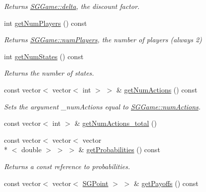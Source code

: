 \begin{DoxyCompactItemize}
\begin{DoxyCompactList}\small\item\em Returns \hyperlink{classSGGame_a5031fc31f8009c19901c0930224e0465}{S\-G\-Game\-::delta}, the discount factor. \end{DoxyCompactList}\item 
\hypertarget{classSGGame_a5ff24b055096ba5d3b7f800f40b07cb9}{int \hyperlink{classSGGame_a5ff24b055096ba5d3b7f800f40b07cb9}{get\-Num\-Players} () const }\label{classSGGame_a5ff24b055096ba5d3b7f800f40b07cb9}

\begin{DoxyCompactList}\small\item\em Returns \hyperlink{classSGGame_a6f02e3f92db6a3c5d2d9076dcb7b6d61}{S\-G\-Game\-::num\-Players}, the number of players (always 2) \end{DoxyCompactList}\item 
\hypertarget{classSGGame_a680798dd8f42a1e1cb088745e7b952af}{int \hyperlink{classSGGame_a680798dd8f42a1e1cb088745e7b952af}{get\-Num\-States} () const }\label{classSGGame_a680798dd8f42a1e1cb088745e7b952af}

\begin{DoxyCompactList}\small\item\em Returns the number of states. \end{DoxyCompactList}\item 
\hypertarget{classSGGame_a2502088ee42a763cb92e879363e48cf4}{const vector$<$ vector$<$ int $>$ $>$ \& \hyperlink{classSGGame_a2502088ee42a763cb92e879363e48cf4}{get\-Num\-Actions} () const }\label{classSGGame_a2502088ee42a763cb92e879363e48cf4}

\begin{DoxyCompactList}\small\item\em Sets the argument \-\_\-num\-Actions equal to \hyperlink{classSGGame_acebe94d195ffb67f92925bcd4c26d1a9}{S\-G\-Game\-::num\-Actions}. \end{DoxyCompactList}\item 
const vector$<$ int $>$ \& \hyperlink{classSGGame_a02facc17211bcbac355cf2bfff95391f}{get\-Num\-Actions\-\_\-total} ()
\item 
\hypertarget{classSGGame_aef7e539a401cf805e58903c7d881f097}{const vector$<$ vector$<$ vector\\*
$<$ double $>$ $>$ $>$ \& \hyperlink{classSGGame_aef7e539a401cf805e58903c7d881f097}{get\-Probabilities} () const }\label{classSGGame_aef7e539a401cf805e58903c7d881f097}

\begin{DoxyCompactList}\small\item\em Returns a const reference to probabilities. \end{DoxyCompactList}\item 
\hypertarget{classSGGame_ad0850e478f2ef1f67c61a0aaa4506c14}{const vector$<$ vector$<$ \hyperlink{classSGPoint}{S\-G\-Point} $>$ $>$ \& \hyperlink{classSGGame_ad0850e478f2ef1f67c61a0aaa4506c14}{get\-Payoffs} () const }\label{classSGGame_ad0850e478f2ef1f67c61a0aaa4506c14}


\end{DoxyCompactItemize}
